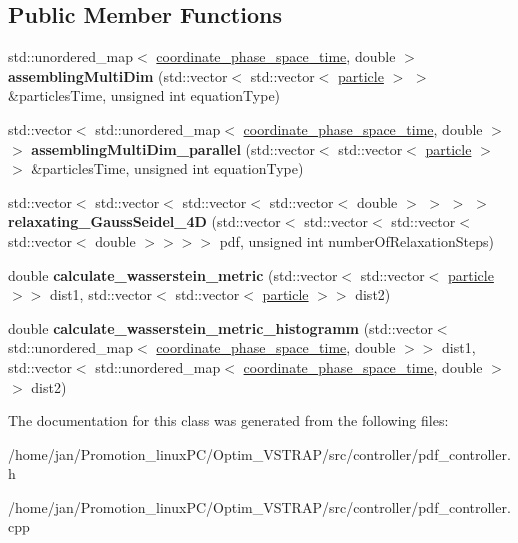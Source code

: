 \subsection*{Public Member Functions}
\begin{DoxyCompactItemize}
\item 
\mbox{\label{classpdf__controller_a476c4b6bab7a40ea57793806faf334b8}} 
std\+::unordered\+\_\+map$<$ \hyperlink{classcoordinate__phase__space__time}{coordinate\+\_\+phase\+\_\+space\+\_\+time}, double $>$ {\bfseries assembling\+Multi\+Dim} (std\+::vector$<$ std\+::vector$<$ \hyperlink{classparticle}{particle} $>$ $>$ \&particles\+Time, unsigned int equation\+Type)
\item 
\mbox{\label{classpdf__controller_a9f1486ae3b861978069f3b1dcfdb0367}} 
std\+::vector$<$ std\+::unordered\+\_\+map$<$ \hyperlink{classcoordinate__phase__space__time}{coordinate\+\_\+phase\+\_\+space\+\_\+time}, double $>$ $>$ {\bfseries assembling\+Multi\+Dim\+\_\+parallel} (std\+::vector$<$ std\+::vector$<$ \hyperlink{classparticle}{particle} $>$ $>$ \&particles\+Time, unsigned int equation\+Type)
\item 
\mbox{\label{classpdf__controller_add7f5f1aafd15dfc45623059ad845e34}} 
std\+::vector$<$ std\+::vector$<$ std\+::vector$<$ std\+::vector$<$ double $>$ $>$ $>$ $>$ {\bfseries relaxating\+\_\+\+Gauss\+Seidel\+\_\+4D} (std\+::vector$<$ std\+::vector$<$ std\+::vector$<$ std\+::vector$<$ double $>$$>$$>$$>$ pdf, unsigned int number\+Of\+Relaxation\+Steps)
\item 
\mbox{\label{classpdf__controller_a0e5c2d07f1bd3bfacd2494942f7975c1}} 
double {\bfseries calculate\+\_\+wasserstein\+\_\+metric} (std\+::vector$<$ std\+::vector$<$ \hyperlink{classparticle}{particle} $>$$>$ dist1, std\+::vector$<$ std\+::vector$<$ \hyperlink{classparticle}{particle} $>$$>$ dist2)
\item 
\mbox{\label{classpdf__controller_a68925f6754a06e4a83cec462959a5875}} 
double {\bfseries calculate\+\_\+wasserstein\+\_\+metric\+\_\+histogramm} (std\+::vector$<$ std\+::unordered\+\_\+map$<$ \hyperlink{classcoordinate__phase__space__time}{coordinate\+\_\+phase\+\_\+space\+\_\+time}, double $>$$>$ dist1, std\+::vector$<$ std\+::unordered\+\_\+map$<$ \hyperlink{classcoordinate__phase__space__time}{coordinate\+\_\+phase\+\_\+space\+\_\+time}, double $>$$>$ dist2)
\end{DoxyCompactItemize}


The documentation for this class was generated from the following files\+:\begin{DoxyCompactItemize}
\item 
/home/jan/\+Promotion\+\_\+linux\+P\+C/\+Optim\+\_\+\+V\+S\+T\+R\+A\+P/src/controller/pdf\+\_\+controller.\+h\item 
/home/jan/\+Promotion\+\_\+linux\+P\+C/\+Optim\+\_\+\+V\+S\+T\+R\+A\+P/src/controller/pdf\+\_\+controller.\+cpp\end{DoxyCompactItemize}

